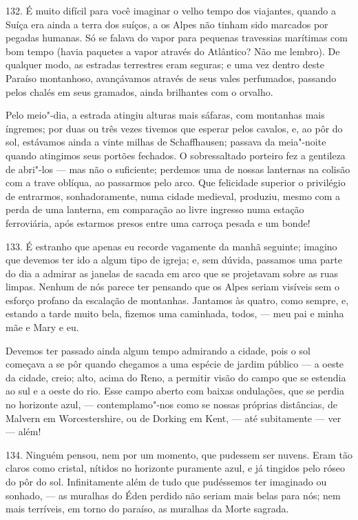 132. É muito difícil para você imaginar o velho tempo dos viajantes,
quando a Suíça era ainda a terra dos suíços, a os Alpes não tinham sido
marcados por pegadas humanas. Só se falava do vapor para pequenas
travessias marítimas com bom tempo (havia paquetes a vapor através do
Atlântico? Não me lembro). De qualquer modo, as estradas terrestres eram
seguras; e uma vez dentro deste Paraíso montanhoso, avançávamos através
de seus vales perfumados, passando pelos chalés em seus gramados, ainda
brilhantes com o orvalho.

Pelo meio"-dia, a estrada atingiu alturas mais sáfaras, com montanhas
mais íngremes; por duas ou três vezes tivemos que esperar pelos cavalos,
e, ao pôr do sol, estávamos ainda a vinte milhas de Schaffhausen;
passava da meia"-noite quando atingimos seus portões fechados. O
sobressaltado porteiro fez a gentileza de abri"-los --- mas não o
suficiente; perdemos uma de nossas lanternas na colisão com a trave
oblíqua, ao passarmos pelo arco. Que felicidade superior o privilégio de
entrarmos, sonhadoramente, numa cidade medieval, produziu, mesmo com a
perda de uma lanterna, em comparação ao livre ingresso numa estação
ferroviária, após estarmos presos entre uma carroça pesada e um bonde!

133. É estranho que apenas eu recorde vagamente da manhã seguinte;
imagino que devemos ter ido a algum tipo de igreja; e, sem dúvida,
passamos uma parte do dia a admirar as janelas de sacada em arco que se
projetavam sobre as ruas limpas. Nenhum de nós parece ter pensando que
os Alpes seriam visíveis sem o esforço profano da escalação de
montanhas. Jantamos às quatro, como sempre, e, estando a tarde muito
bela, fizemos uma caminhada, todos, --- meu pai e minha mãe e Mary e eu.

Devemos ter passado ainda algum tempo admirando a cidade, pois o sol
começava a se pôr quando chegamos a uma espécie de jardim público --- a
oeste da cidade, creio; alto, acima do Reno, a permitir visão do campo
que se estendia ao sul e a oeste do rio. Esse campo aberto com baixas
ondulações, que se perdia no horizonte azul, --- contemplamo"-nos como se
nossas próprias distâncias, de Malvern em Worcestershire, ou de Dorking
em Kent, --- até subitamente --- ver --- além!

134. Ninguém pensou, nem por um momento, que pudessem ser nuvens. Eram
tão claros como cristal, nítidos no horizonte puramente azul, e já
tingidos pelo róseo do pôr do sol. Infinitamente além de tudo que
pudéssemos ter imaginado ou sonhado, --- as muralhas do Éden perdido não
seriam mais belas para nós; nem mais terríveis, em torno do paraíso, as
muralhas da Morte sagrada.

